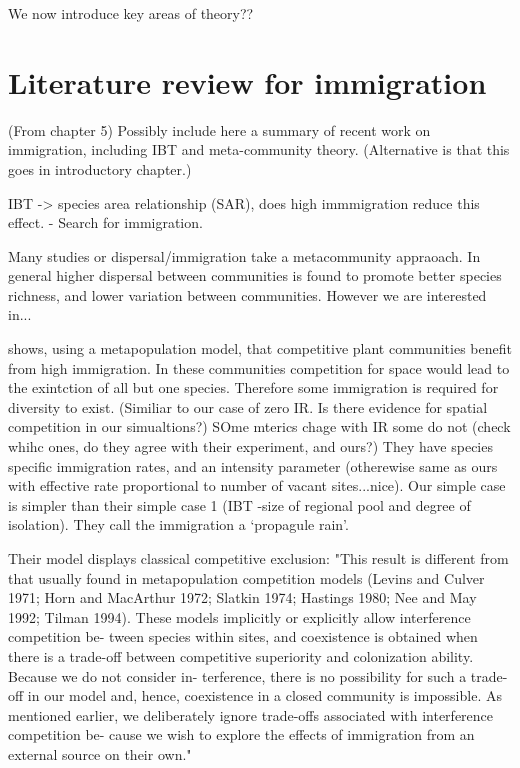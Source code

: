 We now introduce key areas of theory??
  
\section{Literature review for immigration}
(From chapter 5)
Possibly include here a summary of recent work on immigration, including IBT and meta-community theory. (Alternative is that this goes in introductory chapter.) 

IBT -> species area relationship (SAR), does high immmigration reduce this effect. \cite{warren2015islands} - Search for immigration.

\cite{klausmeier2001habitat} Many studies or dispersal/immigration take a metacommunity appraoach. In general higher dispersal between communities is found to promote better species richness, and lower variation between communities. However we are interested in...

\cite{loreau1999immigration} shows, using a metapopulation model, that competitive plant communities benefit from high immigration. In these communities competition for space would lead to the exintction of all but one species. Therefore some immigration is required for diversity to exist. (Similiar to our case of zero IR. Is there evidence for spatial competition in our simualtions?) SOme mterics chage with IR some do not (check whihc ones, do they agree with their experiment, and ours?)	They have species specific immigration rates, and an intensity parameter (otherewise same as ours with effective rate proportional to number of vacant sites...nice). Our simple case is simpler than their simple case 1 (IBT -size of regional pool and degree of isolation). They call the immigration a `propagule rain'.

Their model displays classical competitive exclusion: "This result is different from that usually found in
metapopulation competition models (Levins and Culver
1971; Horn and MacArthur 1972; Slatkin 1974; Hastings
1980; Nee and May 1992; Tilman 1994). These models
implicitly or explicitly allow interference competition be-
tween species within sites, and coexistence is obtained
when there is a trade-off between competitive superiority
and colonization ability. Because we do not consider in-
terference, there is no possibility for such a trade-off in
our model and, hence, coexistence in a closed community
is impossible. As mentioned earlier, we deliberately ignore
trade-offs associated with interference competition be-
cause we wish to explore the effects of immigration from
an external source on their own."

